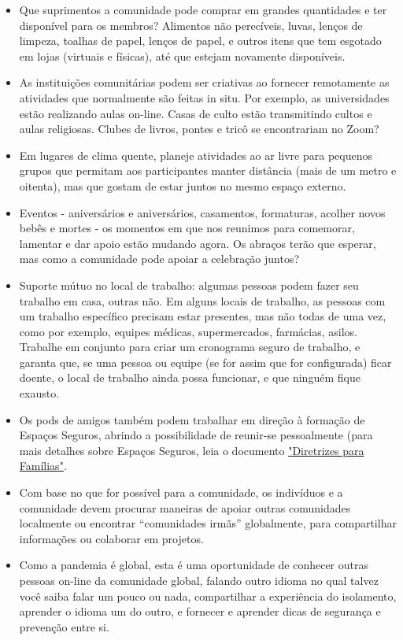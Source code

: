 \documentclass[onecolumn,journal]{IEEEtran}
\begin{document}
\begin{multicols}{2}
\begin{itemize}
    \item Que suprimentos a comunidade pode comprar em grandes quantidades e ter disponível para os membros? Alimentos não perecíveis, luvas, lenços de limpeza, toalhas de papel, lenços de papel, e outros itens que tem esgotado em lojas (virtuais e físicas), até que estejam novamente disponíveis.
    \item As instituições comunitárias podem ser criativas ao fornecer remotamente as atividades que normalmente são feitas in situ. Por exemplo, as universidades estão realizando aulas on-line. Casas de culto estão transmitindo cultos e aulas religiosas. Clubes de livros, pontes e tricô se encontrariam no Zoom?
    \item Em lugares de clima quente, planeje atividades ao ar livre para pequenos grupos que permitam aos participantes manter distância (mais de um metro e oitenta), mas que gostam de estar juntos no mesmo espaço externo.
    \item Eventos - aniversários e aniversários, casamentos, formaturas, acolher novos bebês e mortes - os momentos em que nos reunimos para comemorar, lamentar e dar apoio estão mudando agora. Os abraços terão que esperar, mas como a comunidade pode apoiar a celebração juntos?
    \item Suporte mútuo no local de trabalho: algumas pessoas podem fazer seu trabalho em casa, outras não. Em alguns locais de trabalho, as pessoas com um trabalho específico precisam estar presentes, mas não todas de uma vez, como por exemplo, equipes médicas, supermercados, farmácias, asilos. Trabalhe em conjunto para criar um cronograma seguro de trabalho, e garanta que, se uma pessoa ou equipe (se for assim que for configurada) ficar doente, o local de trabalho ainda possa funcionar, e que ninguém fique exausto.
    \item Os pods de amigos também podem trabalhar em direção à formação de Espaços Seguros, abrindo a possibilidade de reunir-se pessoalmente (para mais detalhes sobre Espaços Seguros, leia o documento \href{https://github.com/necsi/source-translation-text/raw/master/portuguese-br/pdf/Family_port-br.pdf}{"Diretrizes para Famílias"}.
    \item Com base no que for possível para a comunidade, os indivíduos e a comunidade devem procurar maneiras de apoiar outras comunidades localmente ou encontrar “comunidades irmãs” globalmente, para compartilhar informações ou colaborar em projetos.
    \item Como a pandemia é global, esta é uma oportunidade de conhecer outras pessoas on-line da comunidade global, falando outro idioma no qual talvez você saiba falar um pouco ou nada, compartilhar a experiência do isolamento, aprender o idioma um do outro, e fornecer e aprender dicas de segurança e prevenção entre si.

\end{itemize}


\end{multicols}

\vspace{2ex}







% 

\end{document}
